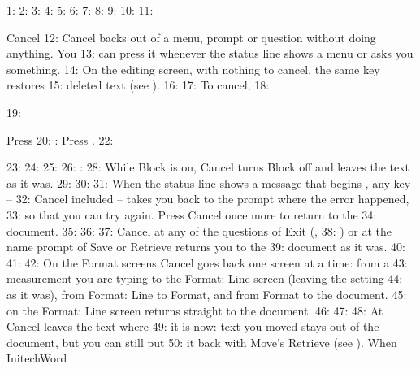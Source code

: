 1: %
2: %
3: %
4: %
5: %
6: %
7: %
8: %
9: %
10: 
11: \begin{Feature}{Cancel}
12: Cancel backs out of a menu, prompt or question without doing anything.  You
13: can press it whenever the status line shows a menu or asks you something.
14: On the editing screen, with nothing to cancel, the same key restores
15: deleted text (see ).
16: 
17: To cancel,
18: \begin{WPSteps}
19: \item Press 
20: : Press .
22: \end{WPSteps}
23: 
24: 
25: 
26: : 
28: While Block is on, Cancel turns Block off and leaves the text as it was.
29: 
30: 
31: When the status line shows a message that begins , any key --
32: Cancel included -- takes you back to the prompt where the error happened,
33: so that you can try again.  Press Cancel once more to return to the
34: document.
35: 
36: 
37: Cancel at any of the questions of Exit (,
38: ) or at the name prompt of Save or Retrieve returns you to the
39: document as it was.
40: 
41: 
42: On the Format screens Cancel goes back one screen at a time: from a
43: measurement you are typing to the Format: Line screen (leaving the setting
44: as it was), from Format: Line to Format, and from Format to the document.
45:  on the Format: Line screen returns straight to the document.
46: 
47: 
48: At  Cancel leaves the text where
49: it is now: text you moved stays out of the document, but you can still put
50: it back with Move's Retrieve (see ).  When InitechWord

\end{Feature}

